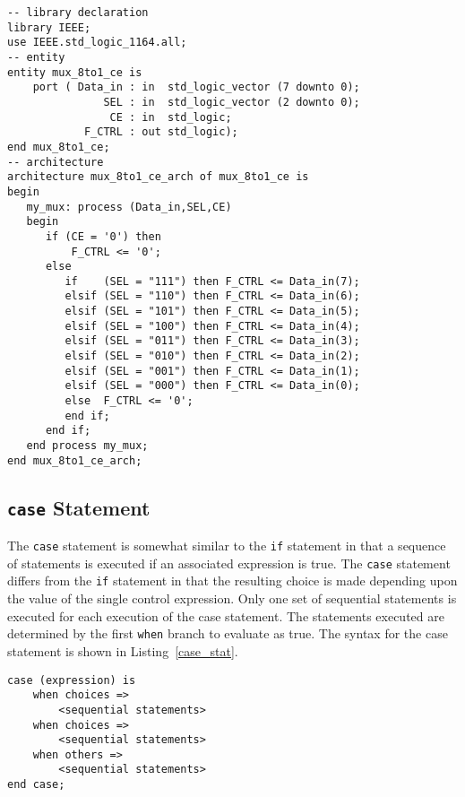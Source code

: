 \noindent
\begin{minipage}{0.99\linewidth}
\begin{lstlisting}[label=exe_11, caption=Solution to Example~11.]
-- library declaration
library IEEE;
use IEEE.std_logic_1164.all;
-- entity
entity mux_8to1_ce is
    port ( Data_in : in  std_logic_vector (7 downto 0);
               SEL : in  std_logic_vector (2 downto 0);
                CE : in  std_logic;
            F_CTRL : out std_logic);  
end mux_8to1_ce;
-- architecture
architecture mux_8to1_ce_arch of mux_8to1_ce is 
begin
   my_mux: process (Data_in,SEL,CE)
   begin
      if (CE = '0') then 
          F_CTRL <= '0'; 
      else 
         if    (SEL = "111") then F_CTRL <= Data_in(7); 
         elsif (SEL = "110") then F_CTRL <= Data_in(6); 
         elsif (SEL = "101") then F_CTRL <= Data_in(5); 
         elsif (SEL = "100") then F_CTRL <= Data_in(4); 
         elsif (SEL = "011") then F_CTRL <= Data_in(3); 
         elsif (SEL = "010") then F_CTRL <= Data_in(2); 
         elsif (SEL = "001") then F_CTRL <= Data_in(1); 
         elsif (SEL = "000") then F_CTRL <= Data_in(0); 
         else  F_CTRL <= '0'; 
         end if; 
      end if; 
   end process my_mux; 
end mux_8to1_ce_arch; 
\end{lstlisting}
\end{minipage}

\subsection{\texttt{case} Statement}
The \texttt{case} statement is somewhat similar to the \texttt{if} statement in that a sequence of statements is executed if an associated expression is true. The \texttt{case} statement differs from the \texttt{if} statement in that the resulting choice is made depending upon the value of the single control expression. Only one set of sequential statements is executed for each execution of the case statement. The statements executed are determined by the first \texttt{when} branch to evaluate as true. The syntax for the case statement is shown in Listing~\ref{case_stat}.

\noindent
\begin{minipage}{0.99\linewidth}
\begin{lstlisting}[label=case_stat, caption=Syntax for the \textit{case} statement.]
case (expression) is
	when choices =>
		<sequential statements>
	when choices =>
		<sequential statements>
	when others =>
		<sequential statements>
end case;
\end{lstlisting}
\end{minipage}

